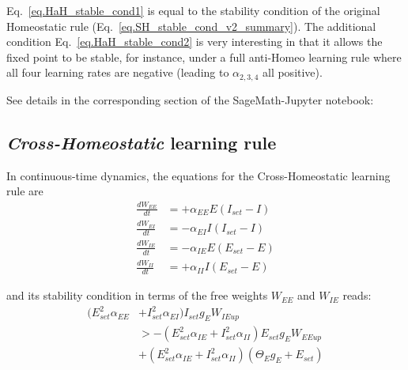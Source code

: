\documentclass[twocolumn]{article}
\newcommand{\EE}{\mathit{EE}}
\newcommand{\EI}{\mathit{EI}}
\newcommand{\IE}{\mathit{IE}}
\newcommand{\II}{\mathit{II}}
\newcommand{\set}{\mathit{set}}
\newcommand{\up}{\mathit{up}}
\begin{document}
\noindent Eq.\ \ref{eq.HaH_stable_cond1} is equal to the stability condition of the original Homeostatic rule (Eq.\ \ref{eq.SH_stable_cond_v2_summary}). The additional condition Eq.\ \ref{eq.HaH_stable_cond2} is very interesting in that it allows the fixed point to be stable, for instance, under a full anti-Homeo learning rule where all four learning rates are negative (leading to $\alpha_{2,3,4}$ all positive).

See details in the corresponding section of the SageMath-Jupyter notebook:






\subsection{{\em Cross-Homeostatic} learning rule}

In continuous-time dynamics, the equations for the Cross-Homeostatic learning rule are
\begin{equation}
\begin{aligned}
\frac{dW_{\EE}}{dt} & = +\alpha_{\EE} E (I_{\set} - I) \\
\frac{dW_{\EI}}{dt} & = -\alpha_{\EI} I (I_{\set} - I) \\
\frac{dW_{\IE}}{dt} & = -\alpha_{\IE} E (E_{\set} - E) \\
\frac{dW_{\II}}{dt} & = +\alpha_{\II} I (E_{\set} - E)
\end{aligned}
\label{eq.CH_equation}
\end{equation}

\noindent and its stability condition in terms of the free weights $W_{\EE}$ and $W_{\IE}$ reads:
\begin{equation}
\begin{aligned}
(E_{\set}^2 \alpha_{\EE} & + I_{\set}^2 \alpha_{\EI}) I_{\set} g_E W_{\IE\up} \\
& >
-(E_{\set}^2 \alpha_{\IE} + I_{\set}^2 \alpha_{\II}) E_{\set} g_E W_{\EE\up} \\
& +
(E_{\set}^2 \alpha_{\IE} + I_{\set}^2 \alpha_{\II}) (\Theta_E g_E + E_{\set})
\end{aligned}
\label{eq.CH_stable_cond_v1}
\end{equation}
\end{document}
